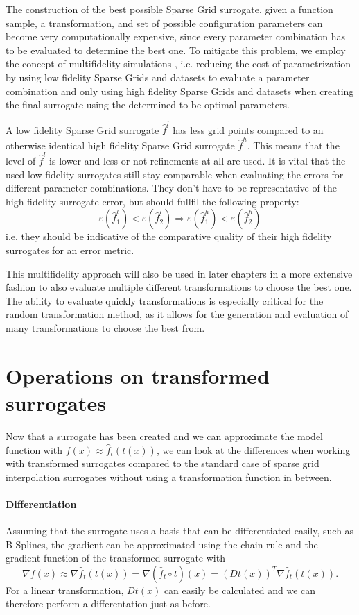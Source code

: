 \documentclass[
  a4paper,  %
  twoside,  %
  bibliography=totoc,
  headsepline,
  cleardoublepage=empty,
  parskip=half,
  draft=false
]{scrbook}
\begin{document}
The construction of the best possible Sparse Grid surrogate, given a function sample, a transformation, and set of possible configuration parameters can become very computationally expensive, since every parameter combination has to be evaluated to determine the best one.
To mitigate this problem, we employ the concept of multifidelity simulations \cite{Robinson2006}, i.e. reducing the cost of parametrization by using low fidelity Sparse Grids and datasets to evaluate a parameter combination and only using high fidelity Sparse Grids and datasets when creating the final surrogate using the determined to be optimal parameters.

A low fidelity Sparse Grid surrogate $\hat{f}^l$ has less grid points compared to an otherwise identical high fidelity Sparse Grid surrogate $\hat{f}^h$.
This means that the level of $\hat{f}^l$ is lower and less or not refinements at all are used.
It is vital that the used low fidelity surrogates still stay comparable when evaluating the errors for different parameter combinations.
They don't have to be representative of the high fidelity surrogate error, but should fullfil the following property:
\begin{equation}
\varepsilon(\hat{f}_1^l) < \varepsilon(\hat{f}_2^l) \Rightarrow \varepsilon(\hat{f}_1^h) < \varepsilon(\hat{f}_2^h)
\end{equation}
i.e. they should be indicative of the comparative quality of their high fidelity surrogates for an error metric.

This multifidelity approach will also be used in later chapters in a more extensive fashion to also evaluate multiple different transformations to choose the best one.
The ability to evaluate quickly transformations is especially critical for the random transformation method, as it allows for the generation and evaluation of many transformations to choose the best from.

\section{Operations on transformed surrogates}

Now that a surrogate has been created and we can approximate the model function with $f(x) \approx \hat{f}_t(t(x))$,
we can look at the differences when working with transformed surrogates compared to the standard case of sparse grid interpolation surrogates without using a transformation function in between.

\paragraph{Differentiation}
Assuming that the surrogate uses a basis that can be differentiated easily, such as B-Splines, the gradient can be approximated using the chain rule and the gradient function of the transformed surrogate with
\begin{equation}
\nabla f(x) \approx \nabla \hat{f}_t(t(x)) = \nabla (\hat{f}_t \circ t)(x)=(Dt(x))^T \nabla \hat{f}_t(t(x)).
\end{equation}
For a linear transformation, $Dt(x)$ can easily be calculated and we can therefore perform a differentation just as before.
\end{document}

